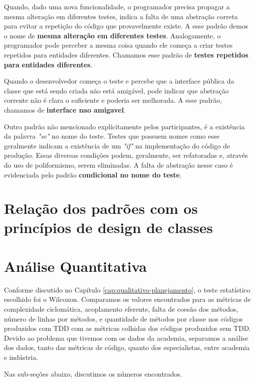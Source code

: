 Quando, dado uma nova funcionalidade, o programador precisa propagar
a mesma alteração em diferentes testes, indica a falta de uma abstração 
correta para evitar a repetição do código que provavelmente existe. A 
esse padrão demos o nome de \textbf{mesma alteração em diferentes testes}.
Analogamente, o programador pode perceber a mesma coisa
quando ele começa a criar testes repetidos para entidades diferentes.
Chamamos esse padrão de \textbf{testes repetidos para entidades diferentes}.

Quando o desenvolvedor começa o teste e percebe que a interface pública da classe
que está sendo criada não está amigável, pode indicar que abstração
corrente não é clara o suficiente e poderia ser melhorada. A esse padrão,
chamamos de \textbf{interface nao amigavel}.

Outro padrão não mencionado explícitamente pelos participantes, 
é a existência da palavra \textit{"se"} no nome do teste. Testes que
possuem nomes como esse geralmente indicam a existência de um \textit{"if"} na implementação
do código de produção. Essas diversas condições podem, geralmente, ser refatoradas e,
através do uso de poliformismo, serem eliminadas. A falta de abstração nesse caso
é evidenciada pelo padrão \textbf{condicional no nome do teste}.

\section{Relação dos padrões com os princípios de design de classes}


\section{Análise Quantitativa}

Conforme discutido no Capítulo \ref{cap:qualitativo-planejamento}, o teste
estatístico escolhido foi o Wilcoxon. Comparamos os valores encontrados
para as métricas de complexidade ciclomática, acoplamento eferente, falta
de coesão dos métodos, número de linhas por métodos, e quantidade de métodos
por classe nos códigos produzidos com TDD com as métricas colhidas dos
códigos produzidos sem TDD.
Devido ao problema que tivemos com os dados da academia, separamos a análise
dos dados, tanto das métricas de código, quanto dos especialistas, entre academia e indústria.

Nas sub-seções abaixo, discutimos os números encontrados.

